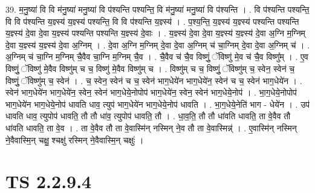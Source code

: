 \documentclass[17pt]{extarticle}
\begin{document}
39. म॒नु॒ष्या॑ वि वि म॑नु॒ष्या॑ मनु॒ष्या॑ वि प॑श्यन्ति पश्यन्ति॒ वि म॑नु॒ष्या॑ मनु॒ष्या॑ वि प॑श्यन्ति । . वि प॑श्यन्ति पश्यन्ति॒ वि वि प॑श्यन्ति य॒ज्ञ्स्य॑ य॒ज्ञ्स्य॑ पश्यन्ति॒ वि वि प॑श्यन्ति य॒ज्ञ्स्य॑ । . प॒श्य॒न्ति॒ य॒ज्ञ्स्य॑ य॒ज्ञ्स्य॑ पश्यन्ति पश्यन्ति य॒ज्ञ्स्य॑ दे॒वा दे॒वा य॒ज्ञ्स्य॑ पश्यन्ति पश्यन्ति य॒ज्ञ्स्य॑ दे॒वाः । . य॒ज्ञ्स्य॑ दे॒वा दे॒वा य॒ज्ञ्स्य॑ य॒ज्ञ्स्य॑ दे॒वा अ॒ग्नि म॒ग्निम् दे॒वा य॒ज्ञ्स्य॑ य॒ज्ञ्स्य॑ दे॒वा अ॒ग्निम् । . दे॒वा अ॒ग्नि म॒ग्निम् दे॒वा दे॒वा अ॒ग्निम् च॑ चा॒ग्निम् दे॒वा दे॒वा अ॒ग्निम् च॑ । . अ॒ग्निम् च॑ चा॒ग्नि म॒ग्निम् चै॒वैव चा॒ग्नि म॒ग्निम् चै॒व । . चै॒वैव च॑ चै॒व विष्णुं॒ ॅविष्णु॑ मे॒व च॑ चै॒व विष्णु᳚म् । . ए॒व विष्णुं॒ ॅविष्णु॑ मे॒वैव विष्णु॑म् च च॒ विष्णु॑ मे॒वैव विष्णु॑म् च । . विष्णु॑म् च च॒ विष्णुं॒ ॅविष्णु॑म् च॒ स्वेन॒ स्वेन॑ च॒ विष्णुं॒ ॅविष्णु॑म् च॒ स्वेन॑ । . च॒ स्वेन॒ स्वेन॑ च च॒ स्वेन॑ भाग॒धेये॑न भाग॒धेये॑न॒ स्वेन॑ च च॒ स्वेन॑ भाग॒धेये॑न । . स्वेन॑ भाग॒धेये॑न भाग॒धेये॑न॒ स्वेन॒ स्वेन॑ भाग॒धेये॒नोपोप॑ भाग॒धेये॑न॒ स्वेन॒ स्वेन॑ भाग॒धेये॒नोप॑ । . भा॒ग॒धेये॒नोपोप॑ भाग॒धेये॑न भाग॒धेये॒नोप॑ धावति धाव॒ त्युप॑ भाग॒धेये॑न भाग॒धेये॒नोप॑ धावति । . भा॒ग॒धेये॒नेति॑ भाग - धेये॑न । . उप॑ धावति धाव॒ त्युपोप॑ धावति॒ तौ तौ धा॑व॒ त्युपोप॑ धावति॒ तौ । . धा॒व॒ति॒ तौ तौ धा॑वति धावति॒ ता वे॒वैव तौ धा॑वति धावति॒ ता वे॒व । . ता वे॒वैव तौ ता वे॒वास्मि॑न् नस्मिन् ने॒व तौ ता वे॒वास्मिन्न्॑ । . ए॒वास्मि॑न् नस्मिन् ने॒वैवास्मि॒न् चक्षु॒ श्चक्षु॑ रस्मिन् ने॒वैवास्मि॒न् चक्षुः॑ । \newline
\pagebreak
{}

\section{ TS 2.2.9.4 }
\end{document}

